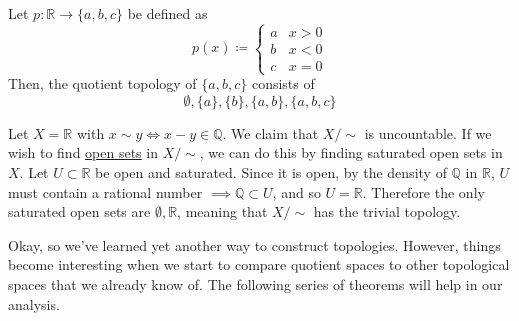   \begin{example}
    \label{ex:quotient-topology-of-a-finite-space}
    Let $p: \mathbb{R} \rightarrow \{a, b, c\}$ be defined as 
    \begin{equation}
      p(x) \coloneqq \begin{cases} a & x > 0 \\ b & x < 0 \\ c & x = 0 \end{cases}
    \end{equation}
    Then, the quotient topology of $\{a, b, c\}$ consists of 
    \begin{equation}
      \emptyset, \{a\}, \{b\}, \{a, b\}, \{a, b, c\}
    \end{equation}
  \end{example}

  \begin{example}
    \label{ex:quotient_trivial}
    Let $X = \mathbb{R}$ with $x \sim y \iff x - y \in \mathbb{Q}$. We claim that $X/{\sim}$ is uncountable. If we wish to find \hyperref[def:open-set]{open sets} in $X/{\sim}$, we can do this by finding saturated open sets in $X$. Let $U \subset \mathbb{R}$ be open and saturated. Since it is open, by the density of $\mathbb{Q}$ in $\mathbb{R}$, $U$ must contain a rational number $\implies \mathbb{Q} \subset U$, and so $U = \mathbb{R}$. Therefore the only saturated open sets are $\emptyset, \mathbb{R}$, meaning that $X/{\sim}$ has the trivial topology. 
  \end{example}

  Okay, so we've learned yet another way to construct topologies. However, things become interesting when we start to compare quotient spaces to other topological spaces that we already know of. The following series of theorems will help in our analysis. 

